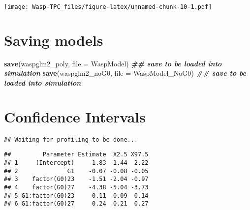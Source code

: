\documentclass[
]{article}
\newenvironment{Shaded}{\begin{snugshade}}{\end{snugshade}}
\newcommand{\AttributeTok}[1]{\textcolor[rgb]{0.13,0.29,0.53}{#1}}
\newcommand{\DocumentationTok}[1]{\textcolor[rgb]{0.56,0.35,0.01}{\textbf{\textit{#1}}}}
\newcommand{\FunctionTok}[1]{\textcolor[rgb]{0.13,0.29,0.53}{\textbf{#1}}}
\newcommand{\NormalTok}[1]{#1}
\newcommand{\StringTok}[1]{\textcolor[rgb]{0.31,0.60,0.02}{#1}}
\begin{document}
\texttt{[image: Wasp-TPC\_files/figure-latex/unnamed-chunk-10-1.pdf]}

\section{Saving models}\label{saving-models}

\begin{Shaded}
\begin{Highlighting}[]
\FunctionTok{save}\NormalTok{(waspglm2\_poly, }\AttributeTok{file =} \StringTok{\textquotesingle{}WaspModel\textquotesingle{}}\NormalTok{) }\DocumentationTok{\#\# save to be loaded into simulation}
\FunctionTok{save}\NormalTok{(waspglm2\_noG0, }\AttributeTok{file =} \StringTok{\textquotesingle{}WaspModel\_NoG0\textquotesingle{}}\NormalTok{) }\DocumentationTok{\#\# save to be loaded into simulation}
\end{Highlighting}
\end{Shaded}

\section{Confidence Intervals}\label{confidence-intervals}

\begin{verbatim}
## Waiting for profiling to be done...
\end{verbatim}

\begin{verbatim}
##         Parameter Estimate  X2.5 X97.5
## 1     (Intercept)     1.83  1.44  2.22
## 2              G1    -0.07 -0.08 -0.05
## 3    factor(G0)23    -1.51 -2.04 -0.97
## 4    factor(G0)27    -4.38 -5.04 -3.73
## 5 G1:factor(G0)23     0.11  0.09  0.14
## 6 G1:factor(G0)27     0.24  0.21  0.27
\end{verbatim}
\end{document}
